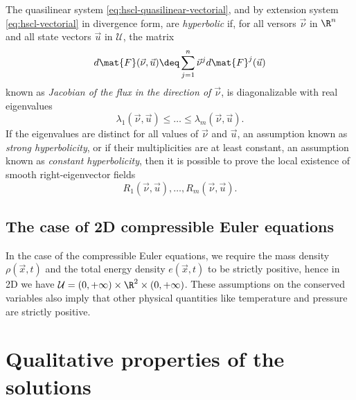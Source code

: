 \begin{defi}
The quasilinear system \eqref{eq:hscl-quasilinear-vectorial},
and by extension system \eqref{eq:hscl-vectorial} in divergence form,
are \emph{hyperbolic} if, for all versors $\vec{\nu}$ in $\R^n$ and all state
vectors $\vec{u}$ in $\mathcal{U}$, the matrix
\[
d\mat{F}(\vec{\nu},\vec{u}) \deq \sum_{j=1}^n \vec{\nu}^j d\mat{F}^j(\vec{u})
\]
known as \emph{Jacobian of the flux in the direction of $\vec{\nu}$},
is diagonalizable with real eigenvalues
\[
\lambda_1(\vec{\nu},\vec{u}) \leq \dots \leq \lambda_m (\vec{\nu},\vec{u}).
\]
If the eigenvalues are distinct for all values of $\vec{\nu}$ and $\vec{u}$,
an assumption known as \emph{strong hyperbolicity},
or if their multiplicities are at least constant, an assumption
known as \emph{constant hyperbolicity}, then it is possible to
prove the local existence of smooth right-eigenvector fields
\[
R_1(\vec{\nu},\vec{u}), \dots, R_m (\vec{\nu},\vec{u}).
\]
\end{defi}



\clearpage


\subsection*{The case of 2D compressible Euler equations}

In the case of the compressible Euler equations, we require the
mass density $\rho(\vec{x},t)$ and the total energy density $e(\vec{x},t)$
to be strictly positive, hence in 2D we have
$\mathcal{U} = (0,+\infty) \times \R^2 \times (0,+\infty)$.
These assumptions on the conserved variables also imply that
other physical quantities like temperature and pressure are strictly
positive.

\section{Qualitative properties of the solutions}

